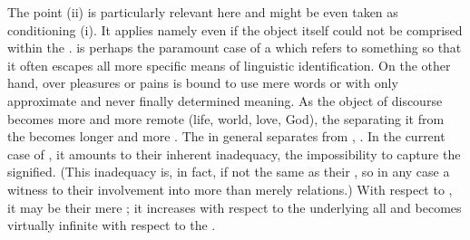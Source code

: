 \label{pa:distance}
The point (ii) is particularly relevant here and might be even taken as
conditioning (i). It applies namely even if the object itself could not be
comprised within the \hoa.  is perhaps the paramount case of a
 which refers to something so  that it often escapes
all more specific means of linguistic identification. On the
other hand,  over pleasures or pains is bound to use mere words
 or  with only approximate and never finally determined
meaning. As the object of discourse becomes more and more remote (life, world,
love, God), the  separating it from the 
becomes longer and more .  The  in general separates
   from , .  In the current
  case of , it amounts to their inherent inadequacy, the impossibility to
  capture the signified. (This inadequacy is, in fact, if not the same as their
  , so in any case a witness to their involvement into 
  more than merely  relations.) With respect to ,
  it may be their mere 
  ; it increases with respect to the 
  underlying all  and becomes virtually infinite with respect
  to the .

